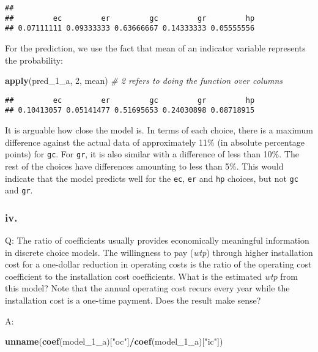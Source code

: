 \documentclass[
]{article}
\newenvironment{Shaded}{\begin{snugshade}}{\end{snugshade}}
\newcommand{\CommentTok}[1]{\textcolor[rgb]{0.56,0.35,0.01}{\textit{#1}}}
\newcommand{\DecValTok}[1]{\textcolor[rgb]{0.00,0.00,0.81}{#1}}
\newcommand{\KeywordTok}[1]{\textcolor[rgb]{0.13,0.29,0.53}{\textbf{#1}}}
\newcommand{\NormalTok}[1]{#1}
\newcommand{\OperatorTok}[1]{\textcolor[rgb]{0.81,0.36,0.00}{\textbf{#1}}}
\newcommand{\StringTok}[1]{\textcolor[rgb]{0.31,0.60,0.02}{#1}}
\begin{document}
\begin{verbatim}
## 
##         ec         er         gc         gr         hp 
## 0.07111111 0.09333333 0.63666667 0.14333333 0.05555556
\end{verbatim}

For the prediction, we use the fact that mean of an indicator variable
represents the probability:

\begin{Shaded}
\begin{Highlighting}[]
\KeywordTok{apply}\NormalTok{(pred_}\DecValTok{1}\NormalTok{_a, }\DecValTok{2}\NormalTok{, mean)  }\CommentTok{# 2 refers to doing the function over columns}
\end{Highlighting}
\end{Shaded}

\begin{verbatim}
##         ec         er         gc         gr         hp 
## 0.10413057 0.05141477 0.51695653 0.24030898 0.08718915
\end{verbatim}

It is arguable how close the model is. In terms of each choice, there is
a maximum difference against the actual data of approximately 11\% (in
absolute percentage points) for \texttt{gc}. For \texttt{gr}, it is also
similar with a difference of less than 10\%. The rest of the choices
have differences amounting to less than 5\%. This would indicate that
the model predicts well for the \texttt{ec}, \texttt{er} and \texttt{hp}
choices, but not \texttt{gc} and \texttt{gr}.

\hypertarget{iv.}{%
\subsubsection{iv.}\label{iv.}}

Q: The ratio of coefficients usually provides economically meaningful
information in discrete choice models. The willingness to pay
(\emph{wtp}) through higher installation cost for a one-dollar reduction
in operating costs is the ratio of the operating cost coefficient to the
installation cost coefficients. What is the estimated \emph{wtp} from
this model? Note that the annual operating cost recurs every year while
the installation cost is a one-time payment. Does the result make sense?

A:

\begin{Shaded}
\begin{Highlighting}[]
\KeywordTok{unname}\NormalTok{(}\KeywordTok{coef}\NormalTok{(model_}\DecValTok{1}\NormalTok{_a)[}\StringTok{"oc"}\NormalTok{]}\OperatorTok{/}\KeywordTok{coef}\NormalTok{(model_}\DecValTok{1}\NormalTok{_a)[}\StringTok{"ic"}\NormalTok{])}
\end{Highlighting}
\end{Shaded}
\end{document}
